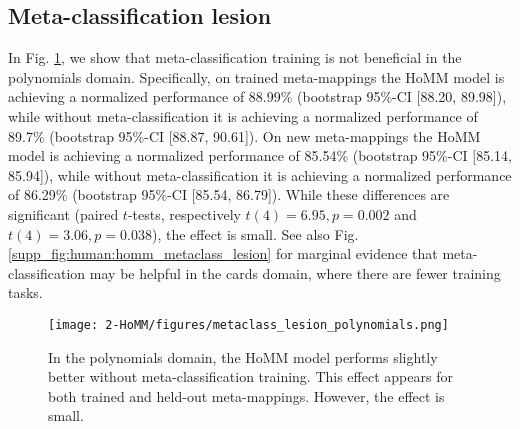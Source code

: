 \subsection{Meta-classification lesion} \label{app:homm:metaclass_lesion}

In Fig. \ref{supp_fig:HoMM:metaclass_lesion}, we show that meta-classification training is not beneficial in the polynomials domain. Specifically, on trained meta-mappings the HoMM model is achieving a normalized performance of 88.99\% (bootstrap 95\%-CI [88.20, 89.98]), while without meta-classification it is achieving a normalized performance of 89.7\% (bootstrap 95\%-CI [88.87, 90.61]). On new meta-mappings the HoMM model is achieving a normalized performance of 85.54\% (bootstrap 95\%-CI [85.14, 85.94]), while without meta-classification it is achieving a normalized performance of 86.29\% (bootstrap 95\%-CI [85.54, 86.79]). While these differences are significant (paired \(t\)-tests, respectively \(t(4) = 6.95, p = 0.002\) and \(t(4) = 3.06, p = 0.038\)), the effect is small. See also Fig. \ref{supp_fig:human:homm_metaclass_lesion} for marginal evidence that meta-classification may be helpful in the cards domain, where there are fewer training tasks. 

\begin{figure}[H]
\centering
\texttt{[image: 2-HoMM/figures/metaclass\_lesion\_polynomials.png]}
\caption[In the polynomials domain, the HoMM model performs slightly better without meta-classification training.]{In the polynomials domain, the HoMM model performs slightly better without meta-classification training. This effect appears for both trained and held-out meta-mappings. However, the effect is small.}\label{supp_fig:HoMM:metaclass_lesion}
\end{figure}


